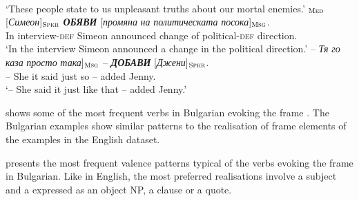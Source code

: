 \documentclass[output=paper,colorlinks,citecolor=brown]{langscibook}
\begin{document}
\begin{exe}
\begin{xlist}
\\
\glt `These people state to us unpleasant truths about our mortal enemies.'
\newpage
\ex  \label{ex:04statementbg:e}
$_{\text{\textsc{Med}}}$ [\textit{Симеон}]$_{\text{\textsc{Spkr}}}$ \textit{\textbf{ОБЯВИ}} [\textit{промяна} \textit{на} \textit{политическата} \textit{посока}]$_{\text{\textsc{Msg}}}$.
\\
{In interview-\textsc{def}} Simeon announced change of political-\textsc{def} direction.
\\
\glt `In the interview Simeon announced a change in the political direction.'
\ex  \label{ex:04statementbg:f}
\gll {[}-- \textit{Тя} \textit{го} \textit{каза} \textit{просто} \textit{така}{]}$_{\text{\textsc{Msg}}}$ -- \textit{\textbf{ДОБАВИ}} [\textit{Джени}]$_{\text{\textsc{Spkr}}}$.
\\
--  She it said just so -- added Jenny.
\\
\glt `-- She said it just like that -- added Jenny.'
\end{xlist}
\end{exe}


 shows some of the most frequent verbs in Bulgarian evoking the frame . The Bulgarian examples show similar patterns to the realisation of frame elements of the examples in the English dataset.

 presents the most frequent valence patterns typical of the verbs evoking the  frame in Bulgarian. Like in English, the most preferred realisations involve a subject  and a  expressed as an object NP, a clause or a quote.
\end{document}
